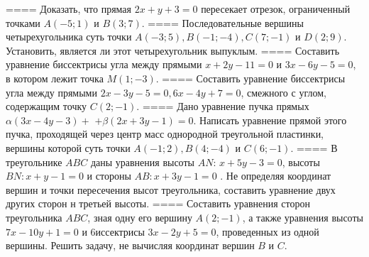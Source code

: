 ====
Доказать, что прямая \(2x + y + 3 = 0\) пересекает отрезок, ограниченный точками \(A( - 5;1)\) и \(B(3;7)\).
====
Последовательные вершины четырехугольника суть точки \(A( - 3;5),B( - 1; - 4),C(7; - 1)\) и \(D(2;9)\). Установить, является ли этот четырехугольник выпуклым.
====
Составить уравнение биссектрисы угла между прямыми \(x + 2y - 11 = 0\) и \(3x - 6y - 5 = 0\), в котором лежит точка \(M(1; - 3)\).
====
Составить уравнение биссектрисы угла между прямыми \(2x - 3y - 5 = 0,6x - 4y + 7 = 0\), смежного с углом, содержащим точку \(C(2; - 1)\).
====
Дано уравнение пучка прямых \(\alpha(3x - 4y - 3) +\) \(+ \beta(2x + 3y - 1) = 0\). Написать уравнение прямой этого пучка, проходящей через центр масс однородной треугольной пластинки, вершины которой суть точки \(A( - 1;2),B(4; - 4)\) и \(C(6; - 1)\).
====
В треугольнике \(ABC\) даны уравнения высоты \(AN\): \(x + 5y - 3 = 0\), высоты \(BN:x + y - 1 = 0\) и стороны \(AB:x + 3y - 1 = 0\) . Не определяя координат вершин и точки пересечения высот треугольника, составить уравнение двух других сторон н третьей высоты.
====
Составить уравнения сторон треугольника \(ABC\), зная одну его вершину \(A(2; - 1)\), а также уравнения высоты \(7x - 10y + 1 = 0\) и 6иссектрисы \(3x - 2y + 5 = 0\), проведенных из одной вершины. Решить задачу, не вычисляя координат вершин \(B\) и \(C\).
